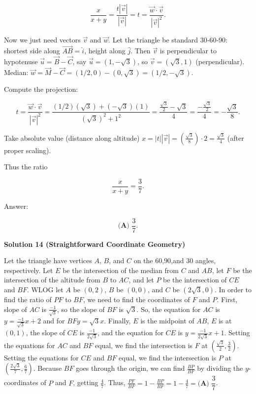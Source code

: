 \begin{enumerate}
 
 \[\frac{x}{x+y} = \frac{t |\vec{v}|}{|\vec{v}|} = t = \frac{\vec{w} \cdot \vec{v}}{|\vec{v}|^2}.\]

 Now we just need vectors \( \vec{v} \) and \( \vec{w} \). Let the triangle be standard 30‑60‑90: shortest side along \( \vec{AB} = \hat{i} \), height along \( \hat{j} \). Then \( \vec{v} \) is perpendicular to hypotenuse \( \vec{u} = \vec{B} - \vec{C} \), say \( \vec{u} = (1, -\sqrt{3}) \), so \( \vec{v} = (\sqrt{3}, 1) \) (perpendicular). Median: \( \vec{w} = \vec{M} - \vec{C} = (1/2, 0) - (0, \sqrt{3}) = (1/2, -\sqrt{3}) \).

 Compute the projection:

 
 \[t = \frac{\vec{w} \cdot \vec{v}}{|\vec{v}|^2} = \frac{(1/2)(\sqrt{3}) + (-\sqrt{3})(1)}{(\sqrt{3})^2 + 1^2} = \frac{\frac{\sqrt{3}}{2} - \sqrt{3}}{4} = \frac{-\frac{\sqrt{3}}{2}}{4} = -\frac{\sqrt{3}}{8}.\]

 Take absolute value (distance along altitude) \( x = |t| |\vec{v}| = (\frac{\sqrt{3}}{8}) \cdot 2 = \frac{\sqrt{3}}{4} \) (after proper scaling).

 Thus the ratio

 
 \[\frac{x}{x+y} = \frac{{3}}{7}.\]

 Answer:

 
 \[\boxed{\textbf{(A) } \dfrac{3}{7}}.\]




\textbf{Solution 14 (Straightforward Coordinate Geometry)}

Let the triangle have vertices $A$, $B$, and $C$ on the $60$,$90$,and $30$ angles, respectively. Let $E$ be the intersection of the median from $C$ and $AB$, let $F$ be the intersection of the altitude from $B$ to $AC$, and let $P$ be the intersection of $CE$ and $BF$. WLOG let $A$ be $(0,2)$, $B$ be $(0,0)$, and $C$ be $(2\sqrt{3},0)$. In order to find the ratio of $PF$ to $BF$, we need to find the coordinates of $F$ and $P$. First, slope of $AC$ is $\frac{-1}{\sqrt{3}}$, so the slope of $BF$ is $\sqrt{3}$. So, the equation for $AC$ is $y = \frac{-1}{\sqrt{3}}x+2$ and for $BF y = \sqrt{3}x$. Finally, $E$ is the midpoint of $AB$, $E$ is at $(0,1)$, the slope of $CE$ is $\frac{-1}{2\sqrt{3}}$, and the equation for $CE$ is $y = \frac{-1}{2\sqrt{3}}x+1$. Setting the equations for $AC$ and $BF$ equal, we find the intersection is $F$ at $(\frac{\sqrt{3}}{2},\frac{3}{2})$. Setting the equations for $CE$ and $BF$ equal, we find the intersection is $P$ at $(\frac{2\sqrt{3}}{7}, \frac{6}{7})$. Because $BF$ goes through the origin, we can find $\frac{BP}{BF}$ by dividing the $y$-coordinates of $P$ and $F$, getting $\frac{4}{7}$. Thus, $\frac{PF}{BF} = 1-\frac{BP}{BF} = 1-\frac{4}{7} = \boxed{\textbf{(A) } \dfrac{3}{7}}$. 


\end{enumerate}
